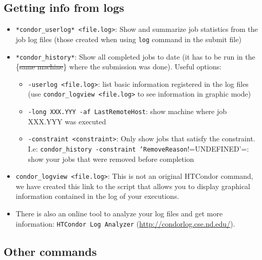 \documentclass[a4paper,10pt]{article}
\begin{document}
\subsection{Getting info from logs}
\label{sec:org1730d21}

\begin{itemize}
\item \texttt{*condor\_userlog* <file.log>}: Show and summarize job statistics from the job
log files (those created when using \texttt{log} command in the submit file)

\item \texttt{*condor\_history*}: Show all completed jobs to date (it has to be run in the
\{\sout{same machine}\} where the submission was done). Useful options:
\begin{itemize}
\item \texttt{-userlog <file.log>}: list basic information registered in the log files (use
\texttt{condor\_logview <file.log>} to see information in graphic mode)
\item \texttt{-long XXX.YYY -af LastRemoteHost}: show machine where job XXX.YYY was
executed
\item \texttt{-constraint <constraint>}: Only show jobs that satisfy the constraint. I.e:
\texttt{condor\_history -constraint 'RemoveReason}!=UNDEFINED'=: show your jobs that
were removed before completion
\end{itemize}

\item \texttt{condor\_logview <file.log>}: This is not an original HTCondor command, we have
created this link to the script that allows you to display graphical
information contained in the log of your executions.

\item There is also an online tool to analyze your log files and get more
information: \texttt{HTCondor Log Analyzer} (\url{http://condorlog.cse.nd.edu/}).
\end{itemize}

\subsection{Other commands}
\label{sec:org48a150c}
\end{document}
